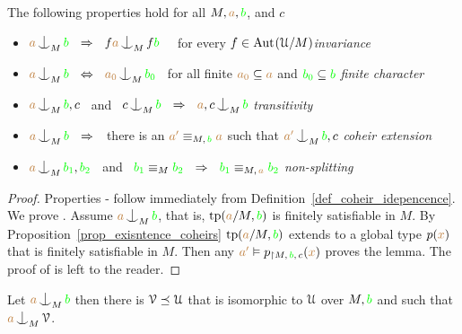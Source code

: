 \begin{lemma}\label{lem_coheir_independence}
  The following properties hold for all $M,{\color{brown} a},{\color{green} b}$, and $c$
  \begin{itemize}
  \item[1.] ${\mr a}\nonfork_M{\gr b}\ \ \IMP\ \ f{\mr a}\nonfork_Mf{\gr b}$ \ \ 
            for every $f\in{\rm Aut\kern.15ex}(\EuScript U/M)$\hfill \textit{invariance}
  \item[2.] ${\mr a}\nonfork_M{\gr b}\ \ \IFF\ \ {\mr a_0}\nonfork_M{\gr b_0}$
            \ for all finite ${\color{brown} a_0}\subseteq{\color{brown}a}$ and 
            ${\color{green} b_0}\subseteq{\color{green}b}$ \hfill\textit{finite character}
  \item[3.] ${\mr a}\nonfork_{M}{\gr b},c$ \ and \ 
            $c\nonfork_M{\gr b}\ \ \IMP\ \ {\mr a},c\nonfork_M{\gr b}$
            \hfill\hfill\hfill\textit{transitivity}
  \item[4.] ${\mr a}\nonfork_M{\gr b}\ \ \IMP\ \ $ 
            there is an ${\color{brown} a'}\equiv_{M,\,{\color{green} b}}{\color{brown} a}$ such that 
            ${\mr a'}\nonfork_M{\gr b},c$
            \textit{coheir extension}
  \item[5.] ${\mr a}\nonfork_M{\gr b_1},{\gr b_2}$ \ and \ 
  ${\color{green} b_1}\equiv_M{\color{green} b_2}\ \ \Rightarrow\ \ {\color{green} b_1}\equiv_{M,\,{\color{brown} a}}{\color{green} b_2}$
            \hspace{\stretch{20}}\textit{non-splitting}
  \end{itemize}
\end{lemma}
\begin{proof}
  Properties - follow immediately from Definition~\ref{def_coheir_idepencence}.
  We prove .
  Assume ${\mr a}\nonfork_M{\gr b}$, that is, ${\rm tp}({\color{brown} a}/M,{\color{green} b})$ is finitely satisfiable in $M$.
  By Proposition~\ref{prop_exisntence_coheirs} ${\rm tp}({\color{brown} a}/M,{\color{green} b})$ extends to a global type $p({\color{brown} x})$ that is finitely satisfiable in $M$.
  Then any ${\color{brown} a'}\vDash p_{\restriction M,\,{\color{green} b},\,c}({\color{brown} x})$ proves the lemma.
  The proof of \ssf{5} is left to the reader.
\end{proof}

\begin{proposition}\label{prop_saturate_heir}
  Let ${\mr a}\nonfork_M{\gr b}$ then there is $\EuScript V\preceq\EuScript U$ that is isomorphic to $\EuScript U$ over $M,{\color{green} b}$ and such that ${\mr a}\nonfork_M\V$.
\end{proposition}


